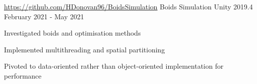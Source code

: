 

\begin{cventries}
    \cventry
    {\href{https://github.com/HDonovan96/BoidsSimulation}{https://github.com/HDonovan96/BoidsSimulation}}
    {Boids Simulation}
    {Unity 2019.4}
    {February 2021 - May 2021}
    {
        \begin{cvitems}
            \item Investigated boids and optimisation methods
            \item Implemented multithreading and spatial partitioning
            \item Pivoted to data-oriented rather than object-oriented implementation for performance
        \end{cvitems}
    }




\end{cventries}

